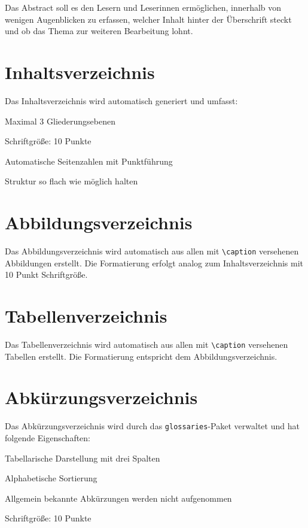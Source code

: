 Das Abstract soll es den Lesern und Leserinnen ermöglichen, innerhalb von wenigen Augenblicken zu erfassen, welcher Inhalt hinter der Überschrift steckt und ob das Thema zur weiteren Bearbeitung lohnt.

\section{Inhaltsverzeichnis}
\label{sec:inhaltsverzeichnis_format}

Das Inhaltsverzeichnis wird automatisch generiert und umfasst:
\begin{listenabsatz}
	\item Maximal 3 Gliederungsebenen
	\item Schriftgröße: 10 Punkte
	\item Automatische Seitenzahlen mit Punktführung
	\item Struktur so flach wie möglich halten
\end{listenabsatz}

\section{Abbildungsverzeichnis}
\label{sec:abbildungsverzeichnis}

Das Abbildungsverzeichnis wird automatisch aus allen mit \texttt{\textbackslash caption} versehenen Abbildungen erstellt. Die Formatierung erfolgt analog zum Inhaltsverzeichnis mit 10 Punkt Schriftgröße.

\section{Tabellenverzeichnis}
\label{sec:tabellenverzeichnis}

Das Tabellenverzeichnis wird automatisch aus allen mit \texttt{\textbackslash caption} versehenen Tabellen erstellt. Die Formatierung entspricht dem Abbildungsverzeichnis.

\section{Abkürzungsverzeichnis}
\label{sec:abkuerzungsverzeichnis}

Das Abkürzungsverzeichnis wird durch das \texttt{glossaries}-Paket verwaltet und hat folgende Eigenschaften:
\begin{listenabsatz}
	\item Tabellarische Darstellung mit drei Spalten
	\item Alphabetische Sortierung
	\item Allgemein bekannte Abkürzungen werden nicht aufgenommen
	\item Schriftgröße: 10 Punkte
\end{listenabsatz}

